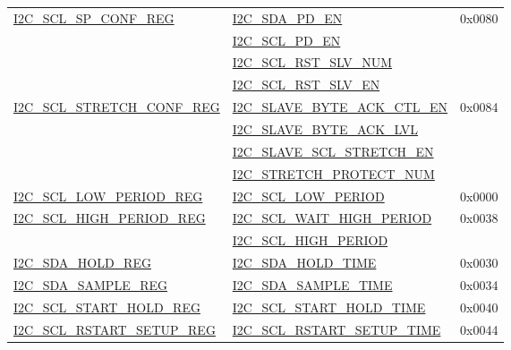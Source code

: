 \documentclass[main\_\_CN.tex]{subfiles}
\begin{document}
\begin{longtable}{ | p{6cm} | p{7cm} | p{2cm} | }
\hyperref[regdesc:I2CSCLSPCONFREG]{I2C\_SCL\_SP\_CONF\_REG} & {\hyperref[fielddesc:I2CSDAPDEN]{I2C\_SDA\_PD\_EN}} & 0x0080  \\\cline{2-2}
& {\hyperref[fielddesc:I2CSCLPDEN]{I2C\_SCL\_PD\_EN}}& \\\cline{2-2}
& {\hyperref[fielddesc:I2CSCLRSTSLVNUM]{I2C\_SCL\_RST\_SLV\_NUM}}& \\\cline{2-2}
& {\hyperref[fielddesc:I2CSCLRSTSLVEN]{I2C\_SCL\_RST\_SLV\_EN}}& \\ \hline


\hyperref[regdesc:I2CSCLSTRETCHCONFREG]{I2C\_SCL\_STRETCH\_CONF\_REG} & {\hyperref[fielddesc:I2CSLAVEBYTEACKCTLEN]{I2C\_SLAVE\_BYTE\_ACK\_CTL\_EN}} & 0x0084  \\\cline{2-2}
& {\hyperref[fielddesc:I2CSLAVEBYTEACKLVL]{I2C\_SLAVE\_BYTE\_ACK\_LVL}}& \\\cline{2-2}
& {\hyperref[fielddesc:I2CSLAVESCLSTRETCHEN]{I2C\_SLAVE\_SCL\_STRETCH\_EN}}& \\\cline{2-2}
& {\hyperref[fielddesc:I2CSTRETCHPROTECTNUM]{I2C\_STRETCH\_PROTECT\_NUM}}& \\ \hline


\hyperref[regdesc:I2CSCLLOWPERIODREG]{I2C\_SCL\_LOW\_PERIOD\_REG} & \hyperref[fielddesc:I2CSCLLOWPERIOD]{I2C\_SCL\_LOW\_PERIOD} & 0x0000  \\ \hline

\hyperref[regdesc:I2CSCLHIGHPERIODREG]{I2C\_SCL\_HIGH\_PERIOD\_REG} & \hyperref[fielddesc:I2CSCLWAITHIGHPERIOD]{I2C\_SCL\_WAIT\_HIGH\_PERIOD} & 0x0038  \\\cline{2-2}
& \hyperref[fielddesc:I2CSCLHIGHPERIOD]{I2C\_SCL\_HIGH\_PERIOD}& \\ \hline

\hyperref[regdesc:I2CSDAHOLDREG]{I2C\_SDA\_HOLD\_REG} & \hyperref[fielddesc:I2CSDAHOLDTIME]{I2C\_SDA\_HOLD\_TIME} & 0x0030  \\\hline
\hyperref[regdesc:I2CSDASAMPLEREG]{I2C\_SDA\_SAMPLE\_REG} & \hyperref[fielddesc:I2CSDASAMPLETIME]{I2C\_SDA\_SAMPLE\_TIME} & 0x0034  \\ \hline

\hyperref[regdesc:I2CSCLSTARTHOLDREG]{I2C\_SCL\_START\_HOLD\_REG} & \hyperref[fielddesc:I2CSCLSTARTHOLDTIME]{I2C\_SCL\_START\_HOLD\_TIME} & 0x0040  \\ \hline
\hyperref[regdesc:I2CSCLRSTARTSETUPREG]{I2C\_SCL\_RSTART\_SETUP\_REG} & \hyperref[fielddesc:I2CSCLRSTARTSETUPTIME]{I2C\_SCL\_RSTART\_SETUP\_TIME} & 0x0044  \\ \hline


\end{longtable}
\end{document}
